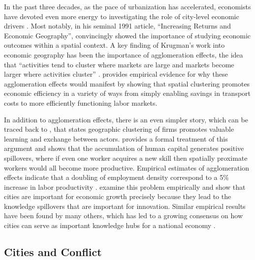 In the past three decades, as the pace of urbanization has accelerated, economists have devoted even more energy to investigating the role of city-level economic drivers \citep{lucas:1988, ciccone:hall:1996, begg:1999, henderson:wang:2007}. Most notably, \citeauthor{krugman:1991a} in his seminal 1991 article, ``Increasing Returns and Economic Geography'', convincingly showed the importance of studying economic outcomes within a spatial context. A key finding of Krugman's work into economic geography has been the importance of agglomeration effects, the idea that ``activities tend to cluster where markets are large and markets become larger where activities cluster'' \citep{krugman:1997}. \citet{henderson:2000} provides empirical evidence for why these agglomeration effects would manifest by showing that spatial clustering promotes economic efficiency in a variety of ways from simply enabling savings in transport costs to more efficiently functioning labor markets.

In addition to agglomeration effects, there is an even simpler story, which can be traced back to \citet{marshall:1920}, that states geographic clustering of firms promotes valuable learning and exchange between actors. \citet{lucas:1988} provides a formal treatment of this argument and shows that the accumulation of human capital generates positive spillovers, where if even one worker acquires a new skill then spatially proximate workers would all become more productive. Empirical estimates of agglomeration effects indicate that a doubling of employment density correspond to a 5\% increase in labor productivity \citep{ciccone:hall:1996,ciccone:2002}. \citet{glaeser:etal:1992} examine this problem empirically and show that cities are important for economic growth precisely because they lead to the knowledge spillovers that are important for innovation. Similar empirical results have been found by many others, which has led to a growing consensus on how cities can serve as important knowledge hubs for a national economy \citep{jaffe:etal:1993, glaeser:1994, firestone:2010}. 


\subsection{Cities and Conflict}


